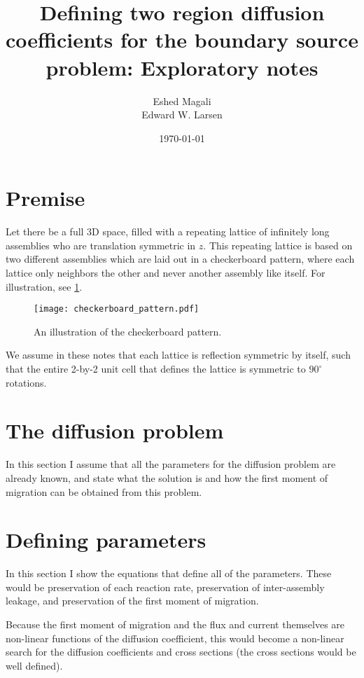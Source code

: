 \documentclass[a4paper,letterpaper,12pt,oneside,draft]{article}
\title{Defining two region diffusion coefficients for the boundary source problem: Exploratory notes}
\author{Eshed Magali \\ Edward W. Larsen}
\date{\today}
\begin{document}
\maketitle

\section{Premise}
    Let there be a full 3D space, filled with a repeating lattice of infinitely long assemblies who are translation symmetric in $z$. 
    This repeating lattice is based on two different assemblies which are laid out in a checkerboard pattern, where each lattice only neighbors the other and never another assembly like itself. 
    For illustration, see \cref{fig:checkerboard}.

    \begin{figure}[H]
        \centering
        \texttt{[image: checkerboard\_pattern.pdf]}
        \caption{An illustration of the checkerboard pattern.}\label{fig:checkerboard}
    \end{figure}

    We assume in these notes that each lattice is reflection symmetric by itself, such that the entire 2-by-2 unit cell that defines the lattice is symmetric to $90^\circ$ rotations.
    
\section{The diffusion problem}
    In this section I assume that all the parameters for the diffusion problem are already known, and state what the solution is and how the first moment of migration can be obtained from this problem.
    
\section{Defining parameters}
    In this section I show the equations that define all of the parameters. These would be preservation of each reaction rate, preservation of inter-assembly leakage, and preservation of the first moment of migration.
    
    Because the first moment of migration and the flux and current themselves are non-linear functions of the diffusion coefficient, this would become a non-linear search for the diffusion coefficients and cross sections (the cross sections would be well defined).    
\end{document}
